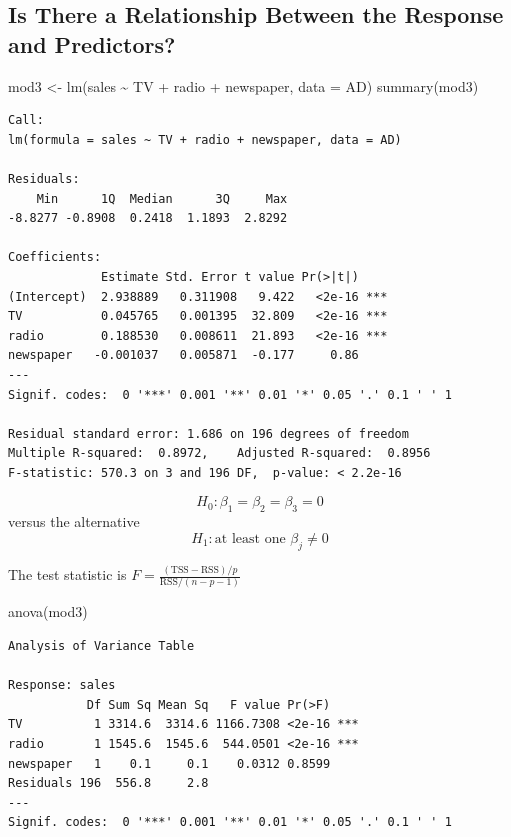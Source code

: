 \documentclass[
]{article}
\newenvironment{Shaded}{\begin{snugshade}}{\end{snugshade}}
\newcommand{\AttributeTok}[1]{\textcolor[rgb]{0.77,0.63,0.00}{#1}}
\newcommand{\FunctionTok}[1]{\textcolor[rgb]{0.00,0.00,0.00}{#1}}
\newcommand{\NormalTok}[1]{#1}
\newcommand{\OtherTok}[1]{\textcolor[rgb]{0.56,0.35,0.01}{#1}}
\newcommand{\SpecialCharTok}[1]{\textcolor[rgb]{0.00,0.00,0.00}{#1}}
\begin{document}
\hypertarget{is-there-a-relationship-between-the-response-and-predictors}{%
\subsection{Is There a Relationship Between the Response and Predictors?}\label{is-there-a-relationship-between-the-response-and-predictors}}

\begin{Shaded}
\begin{Highlighting}[]
\NormalTok{mod3 }\OtherTok{\textless{}{-}} \FunctionTok{lm}\NormalTok{(sales }\SpecialCharTok{\textasciitilde{}}\NormalTok{ TV }\SpecialCharTok{+}\NormalTok{ radio }\SpecialCharTok{+}\NormalTok{ newspaper, }\AttributeTok{data =}\NormalTok{ AD)}
\FunctionTok{summary}\NormalTok{(mod3)}
\end{Highlighting}
\end{Shaded}

\begin{verbatim}
Call:
lm(formula = sales ~ TV + radio + newspaper, data = AD)

Residuals:
    Min      1Q  Median      3Q     Max 
-8.8277 -0.8908  0.2418  1.1893  2.8292 

Coefficients:
             Estimate Std. Error t value Pr(>|t|)    
(Intercept)  2.938889   0.311908   9.422   <2e-16 ***
TV           0.045765   0.001395  32.809   <2e-16 ***
radio        0.188530   0.008611  21.893   <2e-16 ***
newspaper   -0.001037   0.005871  -0.177     0.86    
---
Signif. codes:  0 '***' 0.001 '**' 0.01 '*' 0.05 '.' 0.1 ' ' 1

Residual standard error: 1.686 on 196 degrees of freedom
Multiple R-squared:  0.8972,    Adjusted R-squared:  0.8956 
F-statistic: 570.3 on 3 and 196 DF,  p-value: < 2.2e-16
\end{verbatim}

\[H_0: \beta_1 = \beta_2 = \beta_3 = 0\]
versus the alternative
\[H_1: \text{at least one } \beta_j \neq 0\]

The test statistic is \(F = \frac{(\text{TSS} - \text{RSS})/p}{\text{RSS}/(n-p-1)}\)

\begin{Shaded}
\begin{Highlighting}[]
\FunctionTok{anova}\NormalTok{(mod3)}
\end{Highlighting}
\end{Shaded}

\begin{verbatim}
Analysis of Variance Table

Response: sales
           Df Sum Sq Mean Sq   F value Pr(>F)    
TV          1 3314.6  3314.6 1166.7308 <2e-16 ***
radio       1 1545.6  1545.6  544.0501 <2e-16 ***
newspaper   1    0.1     0.1    0.0312 0.8599    
Residuals 196  556.8     2.8                     
---
Signif. codes:  0 '***' 0.001 '**' 0.01 '*' 0.05 '.' 0.1 ' ' 1
\end{verbatim}
\end{document}
